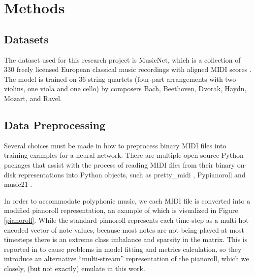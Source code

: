 \documentclass[sigconf,authorversion]{acmart}
\begin{document}
\section{Methods}

\subsection{Datasets}

The dataset used for this research project is MusicNet, which is a
collection of 330 freely licensed European classical music recordings
with aligned MIDI scores \cite{thickstun2017learning}.  The model is
trained on 36 string quartets (four-part arrangements with two
violins, one viola and one cello) by composers Bach, Beethoven,
Dvorak, Haydn, Mozart, and Ravel.

\subsection{Data Preprocessing}

Several choices must be made in how to preprocess binary MIDI files
into training examples for a neural network. There are multiple
open-source Python packages that assist with the process of reading
MIDI files from their binary on-disk representations into Python
objects, such as pretty\_midi \cite{raffel_pretty_midi_2014},
Pypianoroll \cite{dong_pypianoroll_2018} and music21
\cite{cuthbert_music21_2010}.

In order to accommodate polyphonic music, we each MIDI file is
converted into a modified pianoroll representation, an example of
which is visualized in Figure \ref{pianoroll}. While the standard
pianoroll represents each time-step as a multi-hot encoded vector of
note values, because most notes are not being played at most timesteps
there is an extreme class imbalance and sparsity in the matrix. This
is reported in \cite{kumar2019polyphonic} to cause problems in model
fitting and metrics calculation, so they introduce an alternative
``multi-stream'' representation of the pianoroll, which we closely,
(but not exactly) emulate in this work.
\end{document}
